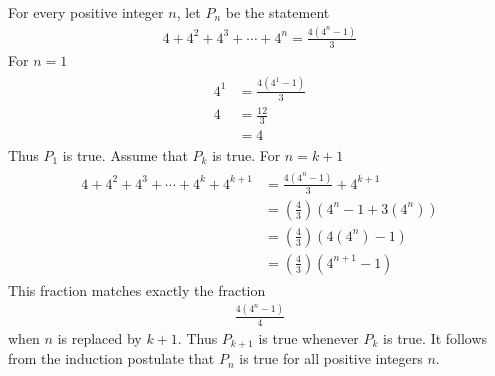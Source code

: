 \documentclass[paper=a4, fontsize=11pt]{jhwhw} %
\begin{document}
For every positive integer $n$, let $P_n$ be the statement
\begin{align}
4 + 4^2 + 4^3 + \cdots + 4^n = \frac{4\left(4^n - 1\right)}{3}
\end{align}
\solution
{}
For $n=1$
\begin{align}
\begin{split}
4^1 &= \frac{4\left(4^1 - 1\right)}{3}\\
4 &=\frac{12}{3}\\
&=4
\end{split}
\end{align}
Thus $P_1$ is true.
Assume that $P_k$ is true.
For $n=k+1$
\begin{align}
\begin{split}
4 + 4^2 + 4^3 + \cdots + 4^k + 4^{k+1} &= \frac{4\left(4^n-1\right)}{3} + 4^{k+1}\\
&=\left(\frac{4}{3}\right)\left(4^n-1 + 3\left(4^n\right)\right)\\
&=\left(\frac{4}{3}\right)\left(4\left(4^n\right)-1\right)\\
&=\left(\frac{4}{3}\right)\left(4^{n+1} - 1\right)
\end{split}
\end{align}
This fraction matches exactly the fraction 
\begin{align}
\frac{4\left(4^n-1\right)}{4}
\end{align}
when $n$ is replaced by $k+1$. Thus $P_{k+1}$ is true whenever $P_k$ is true. It follows from the induction postulate that $P_n$ is true for all positive integers $n$.
\end{document}
